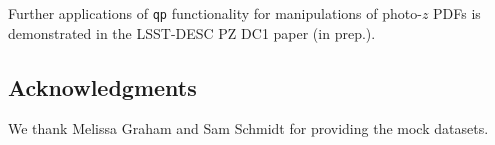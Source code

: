 \documentclass[\docopts]{\docclass}
\begin{document}
Further applications of \texttt{qp} functionality for manipulations of photo-$z$ PDFs is demonstrated in the LSST-DESC PZ DC1 paper (in prep.).

\subsection*{Acknowledgments}


We thank Melissa Graham and Sam Schmidt for providing the mock datasets.







%
\end{document}
